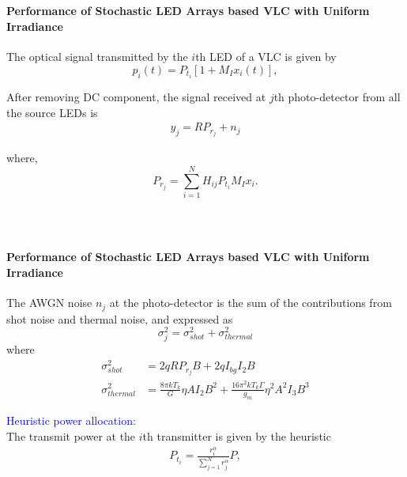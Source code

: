 \documentclass{beamer}
\providecommand{\sbrak}[1]{\ensuremath{{}\left[#1\right]}}
\theoremstyle{remark}
\begin{document}
\begin{frame}
\frametitle{\,}
\framesubtitle{Performance of Stochastic LED Arrays based VLC with Uniform Irradiance}
\begin{list}{}{}
\vfill
\item<1->The optical signal transmitted by the $i$th LED of a VLC is given by %
%
\begin{equation}
p_i(t) = P_{t_i} \sbrak{1 + M_I x_i(t)},\nonumber
\end{equation}
\vfill
\item<2>After removing DC component, the signal received at $j$th photo-detector from all the source LEDs is 
\begin{align}
\label{rx_j}
y_j=RP_{r_j}+n_j\nonumber
\end{align}

\vfill
where,
\begin{equation}
\label{rx_pow}
P_{r_j}=\sum_{i=1}^NH_{ij}P_{t_i}M_Ix_i.\nonumber
\end{equation}
\vfill
\end{list}
\end{frame}
%
\begin{frame}
\frametitle{\,}
\framesubtitle{Performance of Stochastic LED Arrays based VLC with Uniform Irradiance}
\begin{list}{}{}
\vfill
\item<1->The AWGN noise $n_j$ at the photo-detector is 
the sum of the contributions from shot noise and thermal noise, and expressed as %
%
\begin{equation}
\label{variance}
\sigma_j^2 = \sigma_{shot}^2+\sigma_{thermal}^2 \nonumber
\end{equation}
\vfill
where
\begin{equation}
\begin{split}
\sigma_{shot}^2 &= 2qRP_{r_j}B + 2q I_{bg} I_2 B \\
\sigma_{thermal}^2 &=\frac{8\pi kT_k}{G}\eta AI_2B^2 + \frac{16\pi^2kT_k\Gamma}{g_m}\eta^2 A^2I_3B^3
\end{split}\nonumber
\end{equation}
\vfill
\item<2> \textcolor{blue}{Heuristic power allocation:}\\
The transmit power at the $i$th transmitter is 
given by the heuristic
\begin{align}
\label{power_alloc}
P_{t_i}=\frac{r_i^{\alpha}}{\sum_{j=1}^Nr_j^{\alpha}}P,\nonumber
\end{align}
\vfill
\end{list}
\end{frame}
\end{document}
